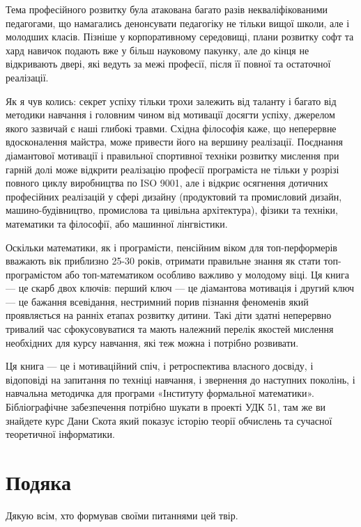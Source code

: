 Тема професійного розвитку була атакована багато разів некваліфікованими педагогами, що намагались денонсувати педагогіку не тільки вищої школи, але і молодших класів. Пізніше у корпоративному середовищі, плани розвитку софт та хард навичок подають вже у більш науковому пакунку, але до кінця не відкривають двері, які ведуть за межі професії, після її повної та остаточної реалізації.

Як я чув колись: секрет успіху тільки трохи залежить від таланту і багато від методики навчання і головним чином від мотивації досягти успіху, джерелом якого зазвичай є наші глибокі травми. Східна філософія каже, що неперервне вдосконалення майстра, може привести його на вершину реалізації. Поєднання діамантової мотивації і правильної спортивної техніки розвитку мислення при гарній долі може відкрити реалізацію професії програміста не тільки у розрізі повного циклу виробництва по ISO 9001, але і відкриє осягнення дотичних професійних реалізацій у сфері дизайну (продуктовий та промисловий дизайн, машино-будівництво, промислова та цивільна архітектура), фізики та техніки, математики та філософії, або машинної лінгвістики.

Оскільки математики, як і програмісти, пенсійним віком для топ-перформерів вважають вік приблизно 25-30 років, отримати правильне знання як стати топ-програмістом або топ-математиком особливо важливо у молодому віці. Ця книга — це скарб двох ключів: перший ключ — це діамантова мотивація і другий ключ — це бажання всевідання, нестримний порив пізнання феноменів який проявляється на ранніх етапах розвитку дитини. Такі діти здатні неперервно тривалий час сфокусовуватися та мають належний перелік якостей мислення необхідних для курсу навчання, які теж можна і потрібно розвивати.

Ця книга — це і мотиваційний спіч, і ретроспектива власного досвіду, і відоповіді на запитання по техніці навчання, і звернення до наступних поколінь, і навчальна методичка для програми «Інституту формальної математики». Бібліографічне забезпечення потрібно шукати в проекті УДК 51, там же ви знайдете курс Дани Скота який показує історію теорії обчислень та сучасної теоретичної інформатики.

\section*{Подяка}

Дякую всім, хто формував своїми питаннями цей твір.

\normalsize

